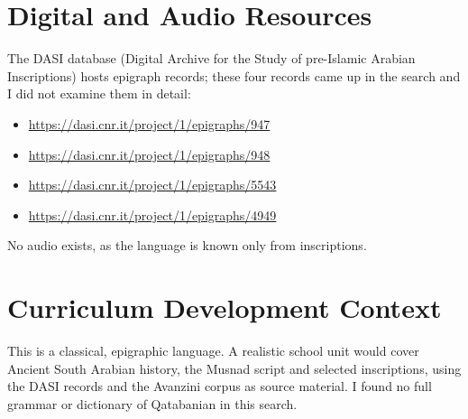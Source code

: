 \documentclass[12pt]{article}
\begin{document}
\section{Digital and Audio Resources}
The DASI database (Digital Archive for the Study of pre-Islamic Arabian Inscriptions) hosts epigraph records; these four records came up in the search and I did not examine them in detail:
\begin{itemize}
\item \url{https://dasi.cnr.it/project/1/epigraphs/947}
\item \url{https://dasi.cnr.it/project/1/epigraphs/948}
\item \url{https://dasi.cnr.it/project/1/epigraphs/5543}
\item \url{https://dasi.cnr.it/project/1/epigraphs/4949}
\end{itemize}
No audio exists, as the language is known only from inscriptions.

\section{Curriculum Development Context}
This is a classical, epigraphic language. A realistic school unit would cover Ancient South Arabian history, the Musnad script and selected inscriptions, using the DASI records and the Avanzini corpus as source material. I found no full grammar or dictionary of Qatabanian in this search.
\end{document}
